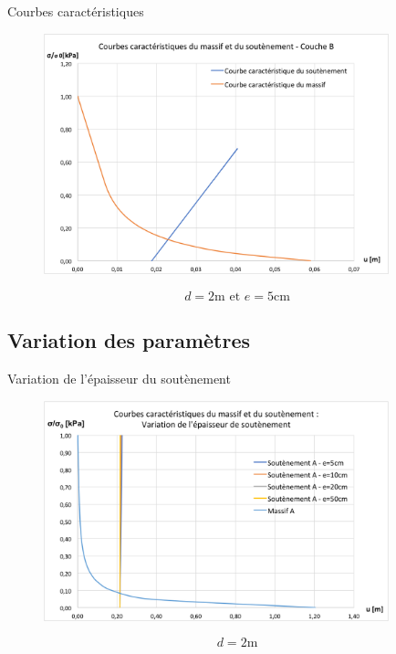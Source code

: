 \documentclass{beamer}
\begin{document}
\begin{frame}{Courbes caractéristiques}

\begin{figure}
\centering
\includegraphics[width=10cm]{sig_u_B2.png}
\end{figure}
\[d=2\text{m et }e=5\text{cm}\]
\end{frame}





\subsection{Variation des paramètres}

\begin{frame}{Variation de l'épaisseur du soutènement}

\begin{figure}
\centering
\includegraphics[width=10cm]{var_eA.png}
\end{figure}
\[d=2\text{m}\]    
\end{frame}
\end{document}

